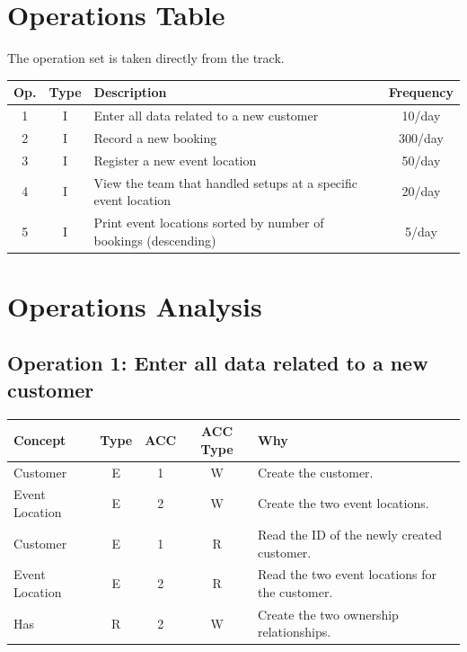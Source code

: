 \section*{Operations Table}

The operation set is taken directly from the track.

\begin{table}[H]
    \centering
    \begin{tabular}{|c|c|p{10cm}|c|}
    \hline
    \textbf{Op.} & \textbf{Type} & \textbf{Description} & \textbf{Frequency} \\
    \hline
    1 & I & Enter all data related to a new customer & 10/day \\
    \hline
    2 & I & Record a new booking & 300/day \\
    \hline
    3 & I & Register a new event location & 50/day \\
    \hline
    4 & I & View the team that handled setups at a specific event location & 20/day \\
    \hline
    5 & I & Print event locations sorted by number of bookings (descending) & 5/day \\
    \hline
    \end{tabular}
\end{table}

\section*{Operations Analysis}

\subsection*{Operation 1: Enter all data related to a new customer}

\begin{table}[H]
    \centering
    \begin{tabular}{|l|c|c|c|p{6.3cm}|}
    \hline
    \textbf{Concept} & \textbf{Type} & \textbf{ACC} & \textbf{ACC Type} & \textbf{Why} \\
    \hline
    Customer & E & 1 & W & Create the customer. \\
    \hline
    Event Location & E & 2 & W & Create the two event locations. \\
    \hline
    Customer & E & 1 & R & Read the ID of the newly created customer. \\
    \hline
    Event Location & E & 2 & R & Read the two event locations for the customer. \\
    \hline
    Has & R & 2 & W & Create the two ownership relationships. \\
    \hline
    \end{tabular}
\end{table}

